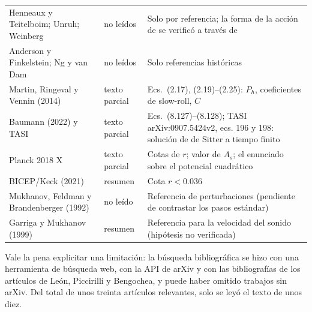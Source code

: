 \begin{longtable}{@{}L{4.2cm}L{2.6cm}L{7.2cm}@{}}
Henneaux y Teitelboim; Unruh; Weinberg \cite{henneaux89,unruh89,weinberg89} & no leídos & Solo por referencia; la forma de la acción de \cite{henneaux89} se verificó a través de \cite{padilla15}\\
Anderson y Finkelstein; Ng y van Dam \cite{anderson71,ng91} & no leídos & Solo referencias históricas\\
Martin, Ringeval y Vennin (2014) \cite{martin14} & texto parcial & Ecs.\ (2.17), (2.19)--(2.25): $P_h$, coeficientes de slow-roll, $C$\\
Baumann (2022) y TASI \cite{baumann22} & texto parcial & Ecs.\ (8.127)--(8.128); TASI arXiv:0907.5424v2, ecs. 196 y 198: solución de de Sitter a tiempo finito\\
Planck 2018 X \cite{planck20} & texto parcial & Cotas de $r$; valor de $A_s$; el enunciado sobre el potencial cuadrático\\
BICEP/Keck (2021) \cite{bicep21} & resumen & Cota $r<0.036$\\
Mukhanov, Feldman y Brandenberger (1992) \cite{mfb92} & no leído & Referencia de perturbaciones (pendiente de contrastar los pasos estándar)\\
Garriga y Mukhanov (1999) \cite{garriga99} & resumen & Referencia para la velocidad del sonido (hipótesis no verificada)\\
\bottomrule
\end{longtable}
\endgroup

Vale la pena explicitar una limitación: la búsqueda bibliográfica se hizo con una herramienta de búsqueda web, con la API de arXiv y con las bibliografías de los artículos de León, Piccirilli y Bengochea, y puede haber omitido trabajos sin arXiv. Del total de unos treinta artículos relevantes, solo se leyó el texto de unos diez.

